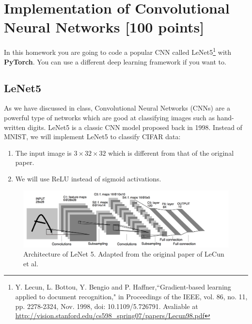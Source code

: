 \documentclass{article}
\begin{document}
\newpage

\section{Implementation of Convolutional Neural Networks [100 points]}
\label{prb:hw7::prob1}

In this homework you are going to code a popular CNN called LeNet5\footnote{Y. Lecun, L. Bottou, Y. Bengio and P. Haffner,``Gradient-based learning applied to document recognition," in Proceedings of the IEEE, vol. 86, no. 11, pp. 2278-2324, Nov. 1998, doi: 10.1109/5.726791. Avaliable at \url{http://vision.stanford.edu/cs598_spring07/papers/Lecun98.pdf}} with \textbf{PyTorch}. You can use a different deep learning framework if you want to.

\subsection{LeNet5}
As we have discussed in class, Convolutional Neural Networks (CNNs) are a powerful type of networks which are good at classifying images such as hand-written digits. LeNet5 is a classic CNN model proposed back in 1998. Instead of MNIST, we will implement LeNet5 to classify CIFAR data: 

\begin{enumerate}
    \item The input image is $3\times32\times 32$ which is different from that of the original paper.
    \item We will use ReLU instead of sigmoid activations.
\end{enumerate}

\begin{figure}[H]
\begin{center}
\includegraphics[scale=0.2]{hw6/images/lenet.png}
\end{center}
\caption{Architecture of LeNet 5. Adapted from the original paper of LeCun et al.}
\end{figure}
\end{document}
